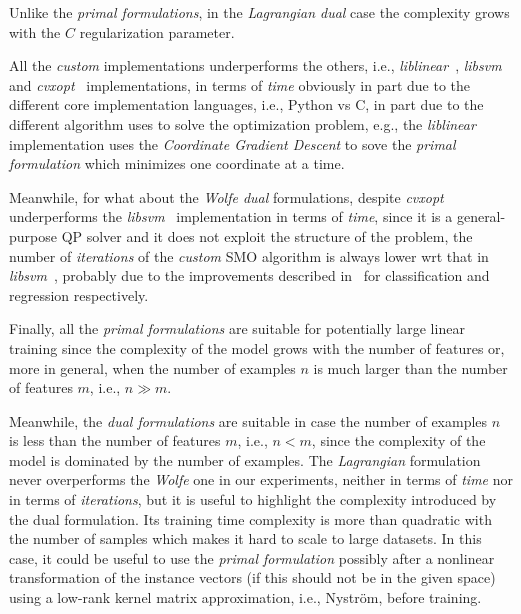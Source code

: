 Unlike the \emph{primal formulations}, in the \emph{Lagrangian dual} case the complexity grows with the $C$ regularization parameter.

\bigskip

All the \emph{custom} implementations underperforms the others, i.e., \emph{liblinear}~\cite{fan2008liblinear}, \emph{libsvm}~\cite{chang2011libsvm} and \emph{cvxopt}~\cite{vandenberghe2010cvxopt} implementations, in terms of \emph{time} obviously in part due to the different core implementation languages, i.e., Python vs C, in part due to the different algorithm uses to solve the  optimization problem, e.g., the \emph{liblinear}~\cite{fan2008liblinear} implementation uses the \emph{Coordinate Gradient Descent} to sove the \emph{primal formulation} which minimizes one coordinate at a time.

Meanwhile, for what about the \emph{Wolfe dual} formulations, despite \emph{cvxopt}~\cite{vandenberghe2010cvxopt} underperforms the \emph{libsvm}~\cite{chang2011libsvm} implementation in terms of \emph{time}, since it is a general-purpose QP solver and it does not exploit the structure of the problem, the number of \emph{iterations} of the \emph{custom} SMO algorithm is always lower wrt that in \emph{libsvm}~\cite{chang2011libsvm}, probably due to the improvements described in~\cite{keerthi2001improvements, shevade1999improvements} for classification and regression respectively.

\bigskip

Finally, all the \emph{primal formulations} are suitable for potentially large linear training since the complexity of the model grows with the number of features or, more in general, when the number of examples $n$ is much larger than the number of features $m$, i.e., $n \gg m$.

Meanwhile, the \emph{dual formulations} are suitable in case the number of examples $n$ is less than the number of features $m$, i.e., $n < m$, since the complexity of the model is dominated by the number of examples. The \emph{Lagrangian} formulation never overperforms the \emph{Wolfe} one in our experiments, neither in terms of \emph{time} nor in terms of \emph{iterations}, but it is useful to highlight the complexity introduced by the dual formulation. Its training time complexity is more than quadratic with the number of samples which makes it hard to scale to large datasets. In this case, it could be useful to use the \emph{primal formulation} possibly after a nonlinear transformation of the instance vectors (if this should not be in the given space) using a low-rank kernel matrix approximation, i.e., Nyström, before training.